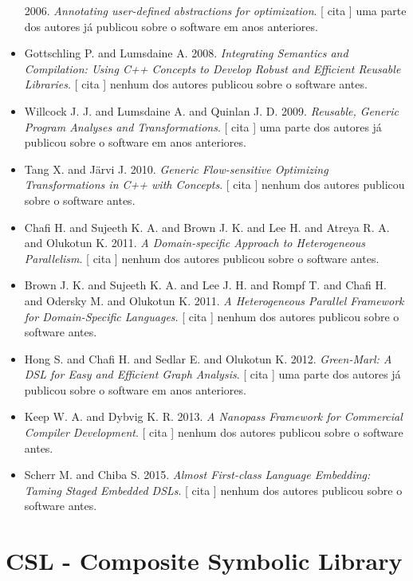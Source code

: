 \begin{itemize}
      2006.
        \textit{ Annotating user-defined abstractions for optimization}.
      [
          cita
      ]
uma parte dos autores já publicou sobre o software em anos anteriores.
\item Gottschling P. and Lumsdaine A.
      2008.
        \textit{ Integrating Semantics and Compilation: Using C++ Concepts to Develop Robust and Efficient Reusable Libraries}.
      [
          cita
      ]
nenhum dos autores publicou sobre o software antes.
\item Willcock J. J. and Lumsdaine A. and Quinlan J. D.
      2009.
        \textit{ Reusable, Generic Program Analyses and Transformations}.
      [
          cita
      ]
uma parte dos autores já publicou sobre o software em anos anteriores.
\item Tang X. and J\"{a}rvi J.
      2010.
        \textit{ Generic Flow-sensitive Optimizing Transformations in C++ with Concepts}.
      [
          cita
      ]
nenhum dos autores publicou sobre o software antes.
\item Chafi H. and Sujeeth K. A. and Brown J. K. and Lee H. and Atreya R. A. and Olukotun K.
      2011.
        \textit{ A Domain-specific Approach to Heterogeneous Parallelism}.
      [
          cita
      ]
nenhum dos autores publicou sobre o software antes.
\item Brown J. K. and Sujeeth K. A. and Lee J. H. and Rompf T. and Chafi H. and Odersky M. and Olukotun K.
      2011.
        \textit{ A Heterogeneous Parallel Framework for Domain-Specific Languages}.
      [
          cita
      ]
nenhum dos autores publicou sobre o software antes.
\item Hong S. and Chafi H. and Sedlar E. and Olukotun K.
      2012.
        \textit{ Green-Marl: A DSL for Easy and Efficient Graph Analysis}.
      [
          cita
      ]
uma parte dos autores já publicou sobre o software em anos anteriores.
\item Keep W. A. and Dybvig K. R.
      2013.
        \textit{ A Nanopass Framework for Commercial Compiler Development}.
      [
          cita
      ]
nenhum dos autores publicou sobre o software antes.
\item Scherr M. and Chiba S.
      2015.
        \textit{ Almost First-class Language Embedding: Taming Staged Embedded DSLs}.
      [
          cita
      ]
nenhum dos autores publicou sobre o software antes.
\end{itemize}
\section{CSL - Composite Symbolic Library}


